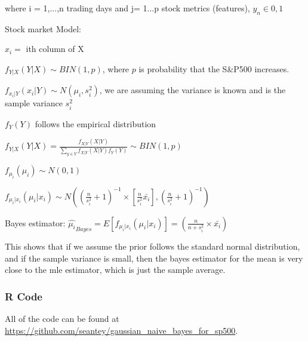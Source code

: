 \documentclass{article}
\begin{document}
\begin{center}
where i = 1,...,n trading days and j= 1...p stock metrics (features), $y_{n} \in {0,1}$
\end{center}

Stock market Model:

$x_i =$ ith column of X\newline

$ f_{Y|X}(Y|X) \sim BIN(1,p)$,  where $p$ is probability that the S\&P500 increases.\newline

$ f_{x_{i}|Y}(x_{i}|Y) \sim N(\mu_{i},s_i^2)$, we are assuming the variance is known and is the sample variance $s_i^2$\newline

$f_Y(Y)$ follows the empirical distribution\newline

$f_{Y|X}(Y|X) = \frac{f_{X|Y}(X|Y)}{\sum_{y \in Y}f_{X|Y}(X|Y)f_{Y}(Y)} \sim BIN(1,p)$\newline

$f_{\mu_{i}}(\mu_{i}) \sim N(0,1)$\newline

$ f_{\mu_{i}|x_{i}}(\mu_{i}|x_{i}) \sim N((\frac{n}{s_i^2} + 1)^{-1}\times[\frac{n}{s_i^2}\bar{x_{i}}],(\frac{n}{s_i^2} + 1)^{-1})$\newline


Bayes estimator:  $\hat{\mu_{i}}_{Bayes} = E[f_{\mu_{i}|x_{i}}(\mu_{i}|x_{i})] = (\frac{n}{n + s_i^2}\times \bar{x_{i}})$\newline



This shows that if we assume the prior follows the standard normal distribution, and if the sample variance is small, then the bayes estimator for the mean is very close to the mle estimator, which is just the sample average. 



\newpage

\subsubsection{R Code}

All of the code can be found at \url{https://github.com/seantey/gaussian_naive_bayes_for_sp500}.
\end{document}
